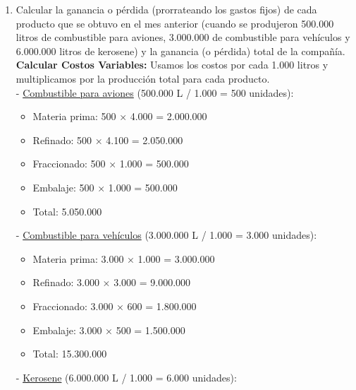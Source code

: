 \documentclass[10pt,a4paper]{article}
\begin{document}
\begin{enumerate}
    \item Calcular la ganancia o pérdida (prorrateando los gastos fijos) de cada producto que se obtuvo en el mes
    anterior (cuando se produjeron 500.000 litros de combustible para aviones, 3.000.000 de combustible para
    vehículos y 6.000.000 litros de kerosene) y la ganancia (o pérdida) total de la compañía. \\

    \textbf{Calcular Costos Variables:} Usamos los costos por cada 1.000 litros y multiplicamos por la producción total para cada producto. \\

    - \underline{Combustible para aviones} (500.000 L / 1.000 = 500 unidades):

    \begin{itemize}

        \item Materia prima: 500 × 4.000 = 2.000.000
        \item Refinado: 500 × 4.100 = 2.050.000
        \item Fraccionado: 500 × 1.000 = 500.000
        \item Embalaje: 500 × 1.000 = 500.000 \\
        \item Total: 5.050.000

    \end{itemize}

    - \underline{Combustible para vehículos} (3.000.000 L / 1.000 = 3.000 unidades):

    \begin{itemize}

        \item Materia prima: 3.000 × 1.000 = 3.000.000
        \item Refinado: 3.000 × 3.000 = 9.000.000
        \item Fraccionado: 3.000 × 600 = 1.800.000
        \item Embalaje: 3.000 × 500 = 1.500.000 \\
        \item Total: 15.300.000

    \end{itemize}

    - \underline{Kerosene} (6.000.000 L / 1.000 = 6.000 unidades):

    \begin{itemize}


\end{itemize}
\end{enumerate}
\end{document}

